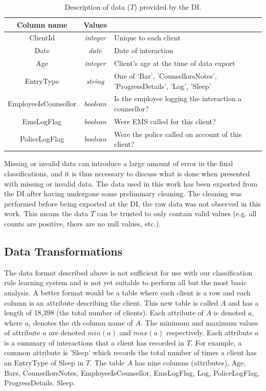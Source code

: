 \begin{table}[h!]
	\begin{tabular}{ c c p{} } 
		\toprule
		Column name & Values &  \\
		\midrule
		ClientId & \emph{integer} & Unique to each client \\
		Date & \emph{date} & Date of interaction \\
		Age & \emph{integer} & Client's age at the time of data export \\
		EntryType & \emph{string} & One of 'Bar', 'CounsellorsNotes', 'ProgressDetails', 'Log', 'Sleep' \\
		EmployeeIsCounsellor & \emph{boolean} & Is the employee logging the interaction a counsellor? \\
		EmsLogFlag & \emph{boolean} & Were EMS called for this client? \\
		PoliceLogFlag & \emph{boolean} & Were the police called on account of this client? \\
		\bottomrule
	\end{tabular}
	\caption{Description of data ($T$) provided by the DI.}
	\label{tbl:university}
\end{table}


Missing or invalid data can introduce a large amount of error in the final classifications, and it is thus necessary to discuss what is done when presented with missing or invalid data. The data used in this work has been exported from the DI after having undergone some preliminary cleaning. The cleaning was performed before being exported at the DI, the raw data was not observed in this work. This means the data $T$ can be trusted to only contain valid values (e.g. all counts are positive, there are no null values, etc.). 

\subsection{Data Transformations}

The data format described above is not sufficient for use with our classification rule learning system and is not yet suitable to perform all but the most basic analysis. A better format would be a table where each client is a row and each column is an attribute describing the client.
This new table is called $A$ and has a length of 18,398 (the total number of clients).
Each attribute of $A$ is denoted $a$, where $a_i$ denotes the $i$th column name of $A$. The minimum and maximum values of attribute $a$ are denoted $min(a)$ and $max(a)$ respectively. Each attribute $a$ is a summary of interactions that a client has recorded in $T$. For example, a common attribute is 'Sleep' which records the total number of times a client has an EntryType of Sleep in $T$.
The table $A$ has nine columns (attributes), Age, Bars, CounsellorsNotes, EmployeeIsCounsellor, EmsLogFlag, Log, PoliceLogFlag, ProgressDetails, Sleep.



